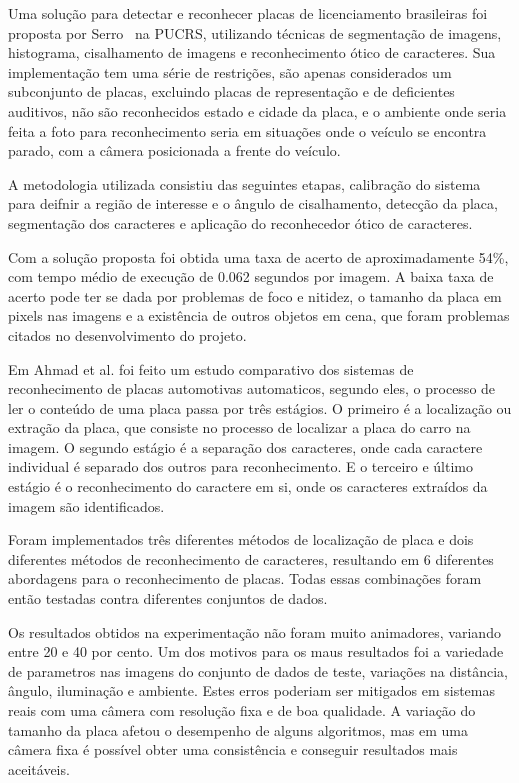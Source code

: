 
Uma solução para detectar e reconhecer placas de licenciamento brasileiras foi
proposta por Serro~\cite{serro2012deteccao} na PUCRS, utilizando técnicas de
segmentação de imagens, histograma, cisalhamento de imagens e reconhecimento
ótico de caracteres. Sua implementação tem uma série de restrições, são apenas
considerados um subconjunto de placas, excluindo placas de representação e de
deficientes auditivos, não são reconhecidos estado e cidade da placa, e o
ambiente onde seria feita a foto para reconhecimento seria em situações onde o
veículo se encontra parado, com a câmera posicionada a frente do veículo.

A metodologia utilizada consistiu das seguintes etapas, calibração do sistema
para deifnir a região de interesse e o ângulo de cisalhamento, detecção da
placa, segmentação dos caracteres e aplicação do reconhecedor ótico de
caracteres.

Com a solução proposta foi obtida uma taxa de acerto de aproximadamente 54\%,
com tempo médio de execução de 0.062 segundos por imagem. A baixa taxa de acerto
pode ter se dada por problemas de foco e nitidez, o tamanho da placa em pixels
nas imagens e a existência de outros objetos em cena, que foram problemas
citados no desenvolvimento do projeto.

Em Ahmad et al.\cite{ahmad2015automatic} foi feito um estudo comparativo dos sistemas de
reconhecimento de placas automotivas automaticos, segundo eles, o processo de
ler o conteúdo de uma placa passa por três estágios. O primeiro é a localização
ou extração da placa, que consiste no processo de localizar a placa do carro na
imagem. O segundo estágio é a separação dos caracteres, onde cada caractere
individual é separado dos outros para reconhecimento. E o terceiro e último
estágio é o reconhecimento do caractere em si, onde os caracteres extraídos da
imagem são identificados.

Foram implementados três diferentes métodos de localização de placa e dois
diferentes métodos de reconhecimento de caracteres, resultando em 6 diferentes
abordagens para o reconhecimento de placas. Todas essas combinações foram então
testadas contra diferentes conjuntos de dados.

Os resultados obtidos na experimentação não foram muito animadores, variando
entre 20 e 40 por cento. Um dos motivos para os maus resultados foi a variedade
de parametros nas imagens do conjunto de dados de teste, variações na distância,
ângulo, iluminação e ambiente. Estes erros poderiam ser mitigados em sistemas
reais com uma câmera com resolução fixa e de boa qualidade. A variação do
tamanho da placa afetou o desempenho de alguns algoritmos, mas em uma câmera
fixa é possível obter uma consistência e conseguir resultados mais aceitáveis.

